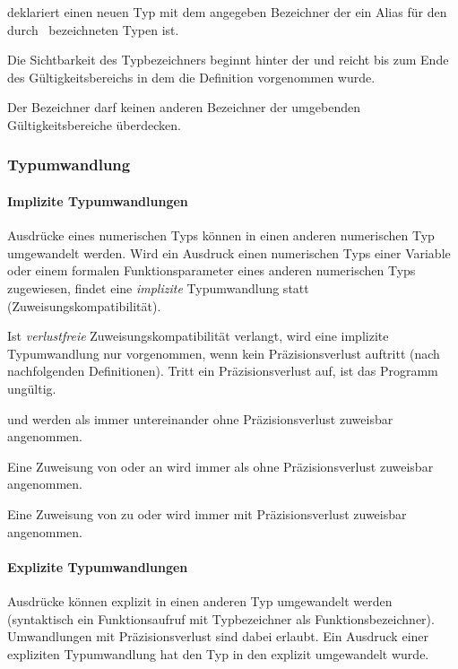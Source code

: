  deklariert einen neuen Typ mit dem angegeben Bezeichner der ein Alias für den durch \glq{}\grq\ bezeichneten Typen ist.

Die Sichtbarkeit des Typbezeichners beginnt hinter der 
und reicht bis zum Ende des Gültigkeitsbereichs in dem die Definition vorgenommen wurde.

Der Bezeichner darf keinen anderen Bezeichner der umgebenden Gültigkeitsbereiche überdecken.


\subsubsection{Typumwandlung}\label{Typumwandlung}

\paragraph{{Implizite Typumwandlungen}}\label{__Implizite Typumwandlungen__}
Ausdrücke eines numerischen Typs können in einen anderen numerischen Typ umgewandelt werden.
Wird ein Ausdruck einen numerischen Typs einer Variable oder einem formalen Funktionsparameter
eines anderen numerischen Typs zugewiesen, findet eine \emph{implizite} Typumwandlung statt
(Zuweisungskompatibilität).

Ist \emph{verlustfreie} Zuweisungskompatibilität verlangt, wird eine implizite Typumwandlung nur
vorgenommen, wenn kein Präzisionsverlust auftritt (nach nachfolgenden Definitionen). Tritt ein
Präzisionsverlust auf, ist das Programm ungültig.

 und  werden als immer untereinander ohne Präzisionsverlust zuweisbar
angenommen.

Eine Zuweisung von  oder  an  wird immer als ohne Präzisionsverlust zuweisbar
angenommen.

Eine Zuweisung von  zu  oder  wird immer mit Präzisionsverlust zuweisbar angenommen.

\paragraph{{Explizite Typumwandlungen}}\label{__Explizite Typumwandlungen__}
Ausdrücke können explizit in einen anderen Typ umgewandelt werden (syntaktisch ein Funktionsaufruf mit
Typbezeichner als Funktionsbezeichner). Umwandlungen mit Präzisionsverlust sind dabei erlaubt.
Ein Ausdruck einer expliziten Typumwandlung hat den Typ in den explizit umgewandelt wurde.


